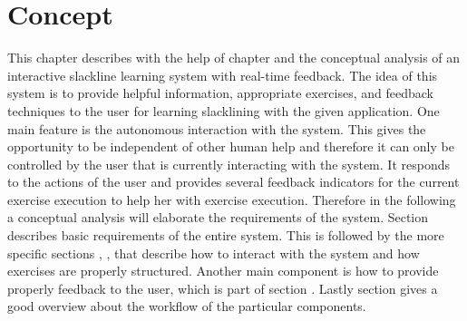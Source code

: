 \chapter{Concept}\label{4_concept}
This chapter describes with the help of chapter \textit{} and \textit{} the conceptual analysis of an interactive slackline learning system with real-time feedback. The idea of this system is to provide helpful information, appropriate exercises, and feedback techniques to the user for learning slacklining with the given application. One main feature is the autonomous interaction with the system. This gives the opportunity to be independent of other human help and therefore it can only be controlled by the user that is currently interacting with the system. It responds to the actions of the user and provides several feedback indicators for the current exercise execution to help her with exercise execution. Therefore in the following a conceptual analysis will elaborate the requirements of the system. Section \textit{} describes basic requirements of the entire system. This is followed by the more specific sections \textit{}, \textit{}, \textit{} that describe how to interact with the system and how exercises are properly structured. Another main component is how to provide properly feedback to the user, which is part of section \textit{}. Lastly section \textit{} gives a good overview about the workflow of the particular components.






